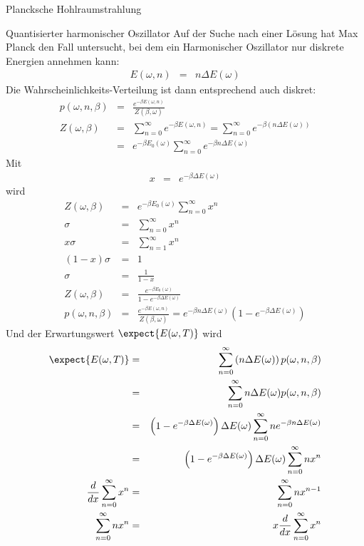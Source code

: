 \begin{chapter}{\titlestr}
\begin{section}{Plancksche Hohlraumstrahlung}
\begin{subsection}{Quantisierter harmonischer Oszillator}
Auf der Suche nach einer Lösung hat Max Planck den Fall untersucht, bei dem ein Harmonischer Oszillator nur diskrete Energien annehmen kann:
\begin{eqnarray*}
E(\omega,n) &=& n\Delta E(\omega)
\end{eqnarray*}
Die Wahrscheinlichkeits-Verteilung ist dann entsprechend auch diskret:
\begin{eqnarray*}
p(\omega,n,\beta)&=& \frac{e^{-\beta E(\omega,n)}}{Z(\beta,\omega)}\\
Z(\omega,\beta) &=& \sum_{n=0}^\infty e^{-\beta E(\omega,n)}= \sum_{n=0}^\infty e^{-\beta\left(n\Delta E(\omega)\right)}\\
&=& e^{-\beta E_0(\omega)}\sum_{n=0}^\infty e^{-\beta n\Delta E(\omega)}
\end{eqnarray*}
Mit
\begin{eqnarray*}
x &=& e^{-\beta \Delta E(\omega)}
\end{eqnarray*}
wird
\begin{eqnarray*}
Z(\omega,\beta) &=& e^{-\beta E_0(\omega)}\sum_{n=0}^\infty x^n\\
\sigma &=& \sum_{n=0}^\infty x^n\\
x\sigma &=& \sum_{n=1}^\infty x^n\\
(1-x)\sigma &=& 1\\
\sigma &=& \frac{1}{1-x}\\
Z(\omega,\beta) &=& \frac{e^{-\beta E_0(\omega)}}{1-e^{-\beta \Delta E(\omega)}}\\
p(\omega,n,\beta)&=& \frac{e^{-\beta E(\omega,n)}}{Z(\beta,\omega)}
=e^{-\beta n\Delta E(\omega)}\left(1-e^{-\beta \Delta E(\omega)}\right)
\end{eqnarray*}
Und der Erwartungswert $\expect{E(\omega,T)}$ wird
\begin{eqnarray*}
\expect{E(\omega,T)} &=& \sum_{n=0}^\infty \left(n\Delta E(\omega)\right)p(\omega,n,\beta)\\
&=& \sum_{n=0}^\infty n\Delta E(\omega)p(\omega,n,\beta)\\
&=& \left(1-e^{-\beta \Delta E(\omega)}\right)\Delta E(\omega)\sum_{n=0}^\infty n e^{-\beta n\Delta E(\omega)}\\
&=& \left(1-e^{-\beta \Delta E(\omega)}\right)\Delta E(\omega)\sum_{n=0}^\infty n x^n\\
\frac{d}{dx}\sum_{n=0}^\infty x^n &=& \sum_{n=0}^\infty nx^{n-1}\\
\sum_{n=0}^\infty n x^n &=& x\frac{d}{dx}\sum_{n=0}^\infty x^n

\end{eqnarray*}
\end{subsection}
\end{section}
\end{chapter}
